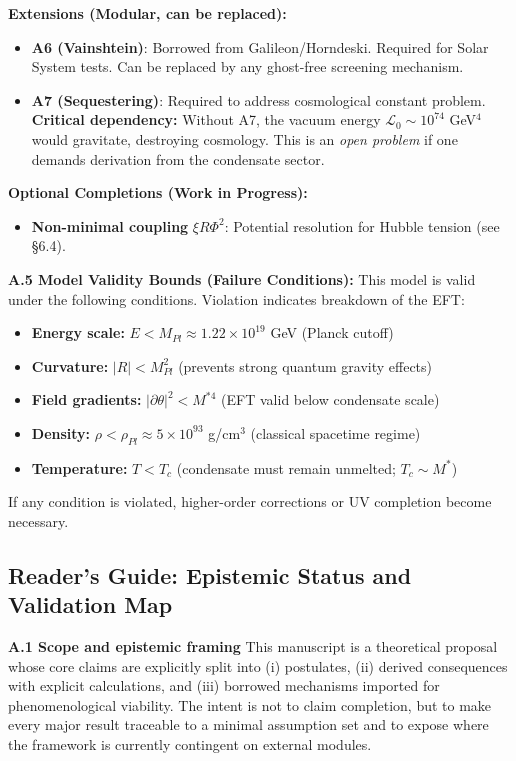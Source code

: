 \documentclass[a4paper,12pt]{article}
\begin{document}
\textbf{Extensions (Modular, can be replaced):}
\begin{itemize}
\item \textbf{A6 (Vainshtein)}: Borrowed from Galileon/Horndeski. Required for Solar System tests. Can be replaced by any ghost-free screening mechanism.
\item \textbf{A7 (Sequestering)}: Required to address cosmological constant problem. \textbf{Critical dependency:} Without A7, the vacuum energy $\mathcal{L}_0 \sim 10^{74}$ GeV$^4$ would gravitate, destroying cosmology. This is an \emph{open problem} if one demands derivation from the condensate sector.
\end{itemize}

\textbf{Optional Completions (Work in Progress):}
\begin{itemize}
\item \textbf{Non-minimal coupling} $\xi R\Phi^2$: Potential resolution for Hubble tension (see §6.4).
\end{itemize}

\textbf{A.5 Model Validity Bounds (Failure Conditions):}
This model is valid under the following conditions. Violation indicates breakdown of the EFT:
\begin{itemize}
    \item \textbf{Energy scale:} $E < M_{Pl} \approx 1.22 \times 10^{19}$ GeV (Planck cutoff)
    \item \textbf{Curvature:} $|R| < M_{Pl}^2$ (prevents strong quantum gravity effects)
    \item \textbf{Field gradients:} $|\partial\theta|^2 < M^{*4}$ (EFT valid below condensate scale)
    \item \textbf{Density:} $\rho < \rho_{Pl} \approx 5 \times 10^{93}$ g/cm$^3$ (classical spacetime regime)
    \item \textbf{Temperature:} $T < T_c$ (condensate must remain unmelted; $T_c \sim M^*$)
\end{itemize}
If any condition is violated, higher-order corrections or UV completion become necessary.

\subsection{Reader's Guide: Epistemic Status and Validation Map}

\textbf{A.1 Scope and epistemic framing}
This manuscript is a theoretical proposal whose core claims are explicitly split into (i) postulates, (ii) derived consequences with explicit calculations, and (iii) borrowed mechanisms imported for phenomenological viability. The intent is not to claim completion, but to make every major result traceable to a minimal assumption set and to expose where the framework is currently contingent on external modules.
\end{document}
